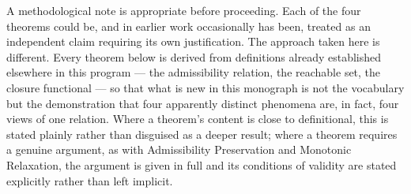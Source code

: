 A methodological note is appropriate before proceeding. Each of the four
theorems could be, and in earlier work occasionally has been, treated as
an independent claim requiring its own justification. The approach taken
here is different. Every theorem below is derived from definitions
already established elsewhere in this program --- the admissibility
relation, the reachable set, the closure functional --- so that what is
new in this monograph is not the vocabulary but the demonstration that
four apparently distinct phenomena are, in fact, four views of one
relation. Where a theorem's content is close to definitional, this is
stated plainly rather than disguised as a deeper result; where a theorem
requires a genuine argument, as with Admissibility Preservation and
Monotonic Relaxation, the argument is given in full and its conditions
of validity are stated explicitly rather than left implicit.
